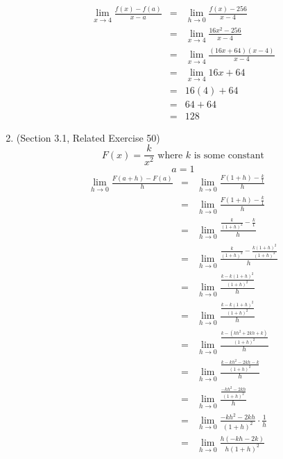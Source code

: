 \documentclass{article}
\begin{document}
\begin{enumerate}
    \begin{eqnarray}
        \lim_{x \to 4}{\frac{f(x) - f(a)}{x - a}} &=& \lim_{h \to 0}{\frac{f(x) - 256}{x - 4}} \\
        &=& \lim_{x \to 4}{\frac{16x^2 - 256}{x - 4}} \\
        &=& \lim_{x \to 4}{\frac{(16x + 64)(x - 4)}{x - 4}} \\
        &=& \lim_{x \to 4}{16x + 64} \\
        &=& 16(4) + 64 \\
        &=& 64 + 64 \\
        &=& 128
    \end{eqnarray}
    \item (Section 3.1, Related Exercise 50)
    $$F(x) = \frac{k}{x^2} \text{ where } k \text{ is some constant}$$
    $$a = 1$$
    \begin{eqnarray}
        \lim_{h \to 0}{\frac{F(a + h) - F(a)}{h}} &=& \lim_{h \to 0}{\frac{F(1 + h) - \frac{k}{1}}{h}} \\
                                                &=& \lim_{h \to 0}{\frac{F(1 + h) - \frac{k}{1}}{h}} \\
                                                &=& \lim_{h \to 0}{\frac{\frac{k}{(1 + h)^2} - \frac{k}{1}}{h}} \\
                                                &=& \lim_{h \to 0}{\frac{\frac{k}{(1 + h)^2} - \frac{k(1 + h)^2}{(1 + h)^2}}{h}} \\
                                                &=& \lim_{h \to 0}{\frac{\frac{k - k(1 + h)^2}{(1 + h)^2}}{h}} \\
                                                &=& \lim_{h \to 0}{\frac{\frac{k - k(1 + h)^2}{(1 + h)^2}}{h}} \\
                                                &=& \lim_{h \to 0}{\frac{\frac{k - (kh^2 + 2kh + k)}{(1 + h)^2}}{h}} \\
                                                &=& \lim_{h \to 0}{\frac{\frac{k - kh^2 - 2kh - k}{(1 + h)^2}}{h}} \\
                                                &=& \lim_{h \to 0}{\frac{\frac{- kh^2 - 2kh}{(1 + h)^2}}{h}} \\
                                                &=& \lim_{h \to 0}{\frac{- kh^2 - 2kh}{(1 + h)^2} \cdot \frac{1}{h}} \\
                                                &=& \lim_{h \to 0}{\frac{h(- kh - 2k)}{h(1 + h)^2}} \\

\end{eqnarray}
\end{enumerate}
\end{document}

